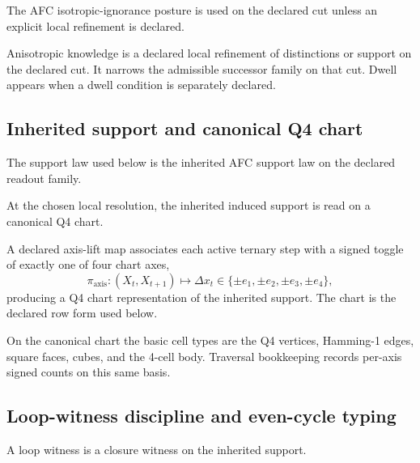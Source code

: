 \begin{choice}
\label{choice:isotropic-ignorance}
The AFC isotropic-ignorance posture is used on the declared cut unless an explicit local refinement is declared.
\end{choice}

\begin{choice}
\label{choice:anisotropic-knowledge}
Anisotropic knowledge is a declared local refinement of distinctions or support on the declared cut. It narrows the admissible successor family on that cut. Dwell appears when a dwell condition is separately declared.
\end{choice}

\subsection{Inherited support and canonical Q4 chart}
\begin{choice}
\label{choice:inherited-support}
The support law used below is the inherited AFC support law on the declared readout family.
\end{choice}

\begin{choice}
\label{choice:q4-chart}
At the chosen local resolution, the inherited induced support is read on a canonical Q4 chart.
\end{choice}

\begin{choice}
\label{choice:axis-lift}
A declared axis-lift map associates each active ternary step with a signed toggle of exactly one of four chart axes,
\[
\pi_{\mathrm{axis}}:(X_t,X_{t+1})\mapsto \Delta x_t\in\{\pm e_1,\pm e_2,\pm e_3,\pm e_4\},
\]
producing a Q4 chart representation of the inherited support. The chart is the declared row form used below.
\end{choice}

\begin{definition}
\label{def:q4-basis}
On the canonical chart the basic cell types are the Q4 vertices, Hamming-1 edges, square faces, cubes, and the 4-cell body. Traversal bookkeeping records per-axis signed counts on this same basis.
\end{definition}

\subsection{Loop-witness discipline and even-cycle typing}
\begin{definition}
\label{def:loop-witness}
A loop witness is a closure witness on the inherited support.
\end{definition}

